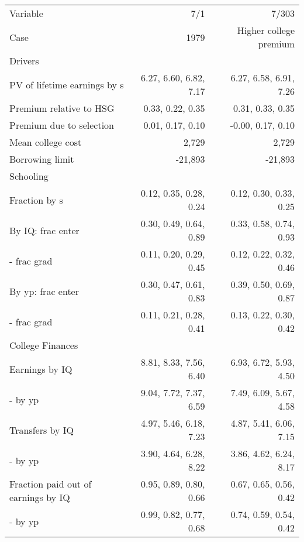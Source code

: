 \begin{tabular}{lrr}
\hline
Variable & 7/1  & 7/303  \\ 
Case & 1979  & Higher college premium  \\ 
Drivers &   &   \\ 
PV of lifetime earnings by s & 6.27, 6.60, 6.82, 7.17  & 6.27, 6.58, 6.91, 7.26  \\ 
Premium relative to HSG & 0.33, 0.22, 0.35  & 0.31, 0.33, 0.35  \\ 
Premium due to selection & 0.01, 0.17, 0.10  & -0.00, 0.17, 0.10  \\ 
Mean college cost & 2,729  & 2,729  \\ 
Borrowing limit & -21,893  & -21,893  \\ 
\hline
Schooling &   &   \\ 
Fraction by s & 0.12, 0.35, 0.28, 0.24  & 0.12, 0.30, 0.33, 0.25  \\ 
By IQ: frac enter & 0.30, 0.49, 0.64, 0.89  & 0.33, 0.58, 0.74, 0.93  \\ 
- frac grad & 0.11, 0.20, 0.29, 0.45  & 0.12, 0.22, 0.32, 0.46  \\ 
By yp: frac enter & 0.30, 0.47, 0.61, 0.83  & 0.39, 0.50, 0.69, 0.87  \\ 
- frac grad & 0.11, 0.21, 0.28, 0.41  & 0.13, 0.22, 0.30, 0.42  \\ 
\hline
College Finances &   &   \\ 
Earnings by IQ & 8.81, 8.33, 7.56, 6.40  & 6.93, 6.72, 5.93, 4.50  \\ 
- by yp & 9.04, 7.72, 7.37, 6.59  & 7.49, 6.09, 5.67, 4.58  \\ 
Transfers by IQ & 4.97, 5.46, 6.18, 7.23  & 4.87, 5.41, 6.06, 7.15  \\ 
- by yp & 3.90, 4.64, 6.28, 8.22  & 3.86, 4.62, 6.24, 8.17  \\ 
Fraction paid out of earnings by IQ & 0.95, 0.89, 0.80, 0.66  & 0.67, 0.65, 0.56, 0.42  \\ 
- by yp & 0.99, 0.82, 0.77, 0.68  & 0.74, 0.59, 0.54, 0.42  \\ 
\hline
\end{tabular}%
